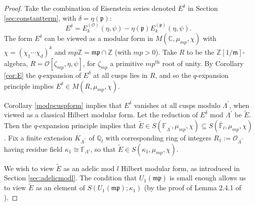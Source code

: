 \documentclass[a4paper,oneside]{amsart}
\theoremstyle{plain}
\theoremstyle{definition}
\begin{document}
\begin{proof}
    Take the combination of Eisenstein series denoted $E^\delta$ in Section \ref{sec:constantterm}, with $\delta = \eta(\mathfrak{p})$:
\begin{equation*}
    E^\delta = E_k^{(\mathcal{O})}(\eta, \psi) - \eta(\mathfrak{p})E_k^{(\mathfrak{p})}(\eta, \psi).
\end{equation*}
The form $E^\delta$ can be viewed as a modular form in $M(\mathbb{C}, \mu_{mp}, \chi)$ with $\chi=(\chi_1\cdots\chi_d)^k$ and $mp\mathbb{Z} = \mathfrak{mp} \cap \mathbb{Z}$ (with $mp>0$). Take $R$ to be the $\mathbb{Z}[1/\mathfrak{m}]$-algebra, $R=\mathcal{O}[\zeta_{mp}, \eta, \psi]$, for $\zeta_{mp}$ a primitive $mp^\text{th}$ root of unity. By Corollary \ref{cor:E} the $q$-expansion of $E^\delta$ at all cusps lies in $R$, and so the $q$-expansion principle implies $E^\delta \in M(R, \mu_{mp}, \chi)$. 

Corollary \ref{modpcuspform} implies that $E^\delta$ vanishes at all cusps modulo $\Lambda^\prime$, when viewed as a classical Hilbert modular form. Let the reduction of $E^\delta$ mod $\Lambda^\prime$ be $\tilde{E}$. Then the $q$-expansion principle implies that $\tilde{E} \in S(\mathbb{F}_{\Lambda^\prime}, \mu_{mp}, \chi)\subseteq S(\bar{\mathbb{F}}_l, \mu_{mp}, \chi)$. Fix a finite extension $K_{\Lambda^{\prime\prime}}$ of $\mathbb{Q}_l$ with corresponding ring of integers $R_1:=\mathcal{O}_{\Lambda^{\prime\prime}}$ having residue field $\kappa_1 \cong \mathbb{F}_{\Lambda'}$, so that $\tilde{E} \in S(\kappa_1, \mu_{mp}, \chi)$. 

We wish to view $\tilde{E}$ as an adelic mod $l$ Hilbert modular form, as introduced in Section \ref{sec:adelicmodl}. The condition that $U_1(\mathfrak{mp})$ is small enough allows us to view $\tilde{E}$ as an element of $S(U_1(\mathfrak{mp});\kappa_1)$ (by the proof of Lemma 2.4.1 of \cite{diamondsasaki}). 


\end{proof}
\end{document}
